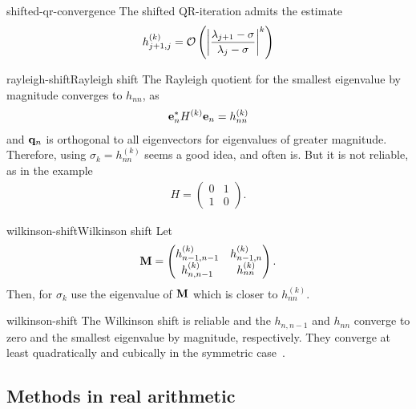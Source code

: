 \begin{Lemma}{shifted-qr-convergence}
  The shifted QR-iteration admits the estimate
  \begin{gather}
    h_{j+1,j}^{(k)} = \bigo \left(\abs*{\frac{\lambda_{j+1}-\sigma}{\lambda_j-\sigma}}^k\right)
  \end{gather}
\end{Lemma}

\begin{Example*}{rayleigh-shift}{Rayleigh shift}
  The Rayleigh quotient for the smallest eigenvalue by magnitude
  converges to $h_{nn}$, as
  \begin{gather}
    \ve_n^* H^{(k)} \ve_n = h_{nn}^{(k)}
  \end{gather}
  and $\vq_n$ is orthogonal to all eigenvectors for eigenvalues of
  greater magnitude. Therefore, using $\sigma_k = h_{nn}^{(k)}$ seems
  a good idea, and often is. But it is not reliable, as in the example
  \begin{gather}
    H =
    \begin{pmatrix}
      0 & 1 \\ 1 & 0
    \end{pmatrix}.
  \end{gather}
\end{Example*}

\begin{Definition*}{wilkinson-shift}{Wilkinson shift}
  Let
  \begin{gather}
    \matm =
    \begin{pmatrix}
      h_{n-1,n-1}^{(k)}&h_{n-1,n}^{(k)}\\h_{n,n-1}^{(k)}&h_{nn}^{(k)}
    \end{pmatrix}.
  \end{gather}
  Then, for $\sigma_k$ use the eigenvalue of $\matm$ which is closer
  to $h_{nn}^{(k)}$.
\end{Definition*}

\begin{Remark}{wilkinson-shift}
  The Wilkinson shift is reliable and the $h_{n,n-1}$ and $h_{nn}$
  converge to zero and the smallest eigenvalue by magnitude,
  respectively. They converge at least quadratically and cubically in
  the symmetric case~\cite[Section 8.2]{GolubVanLoan83}.
\end{Remark}



\subsection{Methods in real arithmetic}

